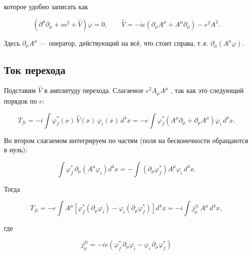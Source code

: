 \documentclass[../final.tex]{subfiles}
\begin{document}
которое удобно записать как

\begin{equation*}
    \left(\partial^\mu\partial_\mu+m^2+\hat V\right)\varphi=0,
    \qquad
    \hat V
    =
    -ie\left(\partial_\mu A^\mu+A^\mu\partial_\mu\right)
    -e^2A^2.
\end{equation*}

Здесь $\partial_\mu A^\mu$ --- оператор, действующий на всё,
что стоит справа, т.\,е. $\partial_\mu(A^\mu\varphi)$.


\subsection{Ток перехода}

Подставим $\hat V$ в амплитуду перехода. Слагаемое
$e^2A_\mu A^\mu$ , так как это
следующий порядок по $e$:

\begin{equation*}
    T_{fi}
    =
    -i\int\varphi_f^*(x)\,\hat V(x)\,\varphi_i(x)\,d^4x
    =
    -e\int\varphi_f^*
    \left(
        A^\mu\partial_\mu+\partial_\mu A^\mu
    \right)
    \varphi_i\,d^4x.
\end{equation*}

Во втором слагаемом интегрируем по частям
(поля на бесконечности обращаются в нуль):

\begin{equation*}
    \int\varphi_f^*\,\partial_\mu\!\left(A^\mu\varphi_i\right)d^4x
    =
    -\int\left(\partial_\mu\varphi_f^*\right)A^\mu\varphi_i\,d^4x.
\end{equation*}

Тогда

\begin{equation*}
    T_{fi}
    =
    -e\int A^\mu
    \left[
        \varphi_f^*\left(\partial_\mu\varphi_i\right)
        -
        \varphi_i\left(\partial_\mu\varphi_f^*\right)
    \right]
    d^4x
    =
    -i\int j^{fi}_\mu\,A^\mu\,d^4x,
\end{equation*}

где

\begin{equation*}
    j^{fi}_\mu
    =
    -ie
    \left(
        \varphi_f^*\,\partial_\mu\varphi_i
        -
        \varphi_i\,\partial_\mu\varphi_f^*
    \right)
\end{equation*}
\end{document}
